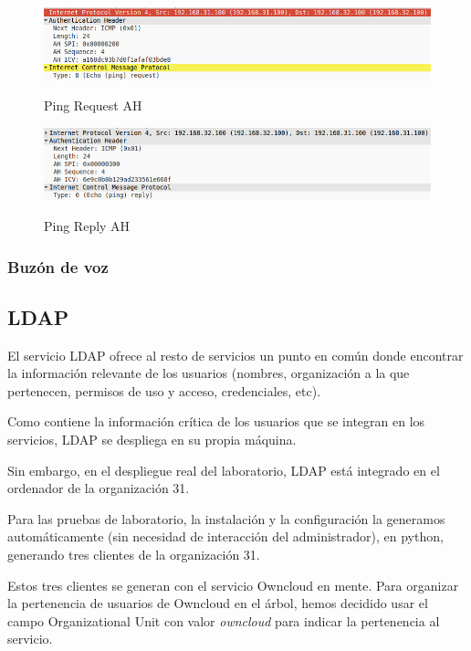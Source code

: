 \documentclass[]{article}
\begin{document}
\begin{figure}[h!]
	\caption{Ping Request AH}
	\centering
	\includegraphics[scale=0.5]{images/ipsec/pingreqAH.png}
	\label{fig:pingreqAH}
\end{figure}

\begin{figure}[h!]
	\caption{Ping Reply AH}
	\centering
	\includegraphics[scale=0.5]{images/ipsec/pingreplyAH.png}
	\label{fig:pingreplyAH}
\end{figure}



\subsubsection{Buzón de voz}





\subsection{LDAP}
El servicio LDAP ofrece al resto de servicios un punto en común donde encontrar la información relevante de los usuarios (nombres,
organización a la que pertenecen, permisos de uso y acceso, credenciales, etc).

Como contiene la información crítica de los usuarios que se integran en los servicios, LDAP se despliega en su propia máquina.

Sin embargo, en el despliegue real del laboratorio, LDAP está integrado en el ordenador de la organización 31.

Para las pruebas de laboratorio, la instalación y la configuración la generamos automáticamente (sin necesidad de interacción del administrador), en python, generando tres clientes de la organización 31.

Estos tres clientes se generan con el servicio Owncloud en mente. Para organizar la pertenencia de usuarios de Owncloud en el árbol, hemos decidido usar el campo Organizational Unit con valor \textit{owncloud} para indicar la pertenencia al servicio.
                                                                                                                                                                                                                                                                     
\end{document}
